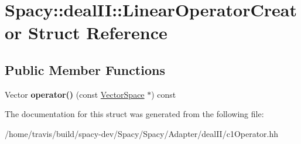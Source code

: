 \hypertarget{structSpacy_1_1dealII_1_1LinearOperatorCreator}{\section{\-Spacy\-:\-:deal\-I\-I\-:\-:\-Linear\-Operator\-Creator \-Struct \-Reference}
\label{structSpacy_1_1dealII_1_1LinearOperatorCreator}
}
\subsection*{\-Public \-Member \-Functions}
\begin{DoxyCompactItemize}
\item 
\hypertarget{structSpacy_1_1dealII_1_1LinearOperatorCreator_a2f608aa462b65fe69bfa8e61659f6534}{\-Vector {\bfseries operator()} (const \hyperlink{classSpacy_1_1VectorSpace}{\-Vector\-Space} $\ast$) const }\label{structSpacy_1_1dealII_1_1LinearOperatorCreator_a2f608aa462b65fe69bfa8e61659f6534}

\end{DoxyCompactItemize}


\-The documentation for this struct was generated from the following file\-:\begin{DoxyCompactItemize}
\item 
/home/travis/build/spacy-\/dev/\-Spacy/\-Spacy/\-Adapter/deal\-I\-I/c1\-Operator.\-hh\end{DoxyCompactItemize}

